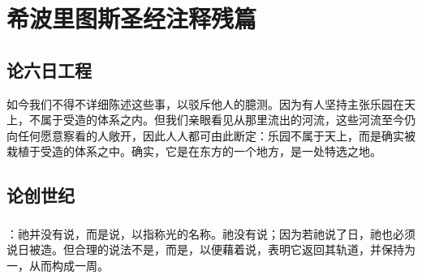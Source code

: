 
\chapter{希波里图斯圣经注释残篇}



\section{论六日工程}

如今我们不得不详细陈述这些事，以驳斥他人的臆测。因为有人坚持主张乐园在天上，不属于受造的体系之内。但我们亲眼看见从那里流出的河流，这些河流至今仍向任何愿意察看的人敞开，因此人人都可由此断定：乐园不属于天上，而是确实被栽植于受造的体系之中。确实，它是在东方的一个地方，是一处特选之地。\par


\section{论创世纪}


\subsection{}

\par

：祂并没有说，而是说，以指称光的名称。祂没有说；因为若祂说了日，祂也必须说日被造。但合理的说法不是，而是，以便藉着说，表明它返回其轨道，并保持为一，从而构成一周。\par


\subsection{}

